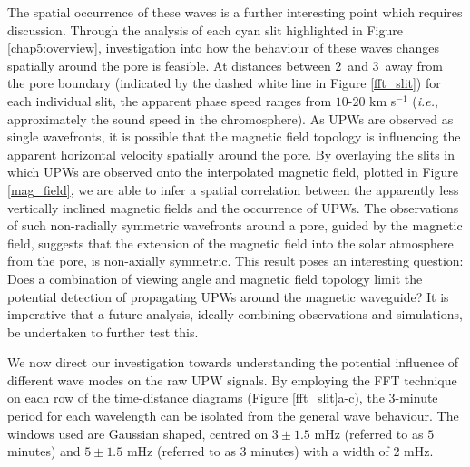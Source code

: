 	The spatial occurrence of these waves is a further interesting point which requires discussion.
	Through the analysis of each cyan slit highlighted in Figure \ref{chap5:overview}, investigation into how the behaviour of these waves changes spatially around the pore is feasible.
	At distances between $2$\arcsecs\ and $3$\arcsecs\ away from the pore boundary (indicated by the dashed white line in Figure \ref{fft_slit}) for each individual slit, the apparent phase speed ranges from $10$-$20$ km s$^{-1}$ (\textit{i.e.}, approximately the sound speed in the chromosphere).
	As UPWs are observed as single wavefronts, it is possible that the magnetic field topology is influencing the apparent horizontal velocity spatially around the pore.
	By overlaying the slits in which UPWs are observed onto the interpolated magnetic field, plotted in Figure \ref{mag_field}, we are able to infer a spatial correlation between the apparently less vertically inclined magnetic fields and the occurrence of UPWs.
	The observations of such non-radially symmetric wavefronts around a pore, guided by the magnetic field, suggests that the extension of the magnetic field into the solar atmosphere from the pore, is non-axially symmetric.
	This result poses an interesting question: Does a combination of viewing angle and magnetic field topology limit the potential detection of propagating UPWs around the magnetic waveguide?
	It is imperative that a future analysis, ideally combining observations and simulations, be undertaken to further test this.

    We now direct our investigation towards understanding the potential influence of different wave modes on the raw UPW signals.
	By employing the FFT technique on each row of the time-distance diagrams (Figure \ref{fft_slit}a-c), the $3$-minute period for each wavelength can be isolated from the general wave behaviour.
	The windows used are Gaussian shaped, centred on $3\pm1.5$ mHz (referred to as $5$ minutes) and $5\pm1.5$ mHz (referred to as $3$ minutes) with a width of 2 mHz.

